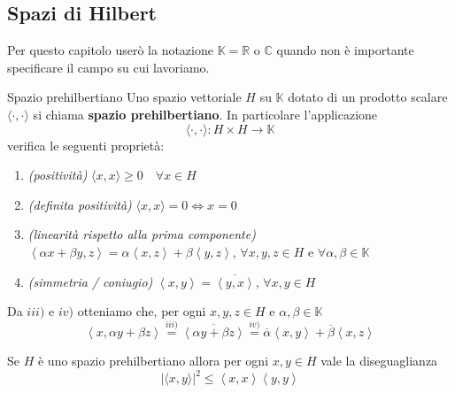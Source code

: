 \subsection{Spazi di Hilbert}
Per questo capitolo userò la notazione \(\mathbb{K} = \mathbb{R}\) o
\(\mathbb{C}\) quando non è importante specificare il campo su cui lavoriamo.
\begin{definition}{Spazio prehilbertiano}
    Uno spazio vettoriale \(H\) su \(\mathbb{K}\) dotato di un
    prodotto scalare \(\langle \cdot, \cdot \rangle\) si chiama \textbf{spazio
    prehilbertiano}. In particolare l'applicazione
    \[
        \langle \cdot, \cdot \rangle : H \times H \to \mathbb{K}
    \]
    verifica le seguenti proprietà:
\begin{enumerate}[label = \roman*)]
    \item \emph{(positività)} \(\langle x, x \rangle \ge 0 \quad \forall x \in H\)
    \item \emph{(definita positività)} \(\langle x, x \rangle = 0 \iff x = 0\)
    \item \emph{(linearità rispetto alla prima componente)} \(\left< \alpha x + \beta y, z \right> = \alpha \left<
        x, z\right> + \beta \left<y, z \right>\), \(\forall x, y, z \in H\) e
        \(\forall \alpha, \beta \in \mathbb{K}\) 
    \item \emph{(simmetria / coniugio)} \(\left< x, y \right> = \overline{\left<
        y, x \right>}\), \(\forall x, y \in H\) 
\end{enumerate}
\end{definition}
\begin{remark}
    Da \(iii)\) e \(iv)\) otteniamo che, per ogni \(x, y, z \in H\) e \(\alpha,
    \beta \in \mathbb{K}\) 
    \[
        \left<x, \alpha y + \beta z \right> \overset{iii)}{=}
        \overline{\left<\alpha y + \beta z \right>} \overset{iv)}{=}
        \overline{\alpha} \left<x, y
        \right> + \overline{\beta} \left<x, z \right>
    \]
\end{remark}
\begin{theorem}\label{thm:schwarz}
    Se \(H\) è uno spazio prehilbertiano allora per ogni \(x, y \in H\) vale la
    diseguaglianza
    \[
        |\langle x, y \rangle|^{2} \le \left<x, x \right> \left<y, y \right>
    \]
\end{theorem}
